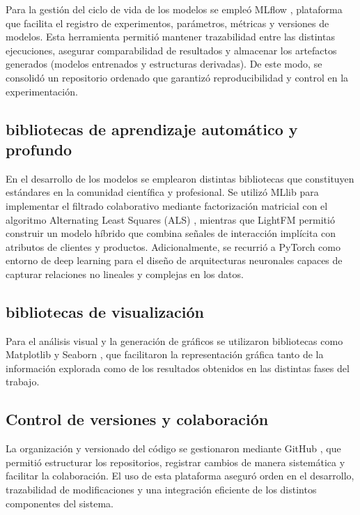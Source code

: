 Para la gestión del ciclo de vida de los modelos se empleó MLflow \cite{ARTICLE:MLflow2018}, plataforma que facilita el registro de experimentos, parámetros, métricas y versiones de modelos. Esta herramienta permitió mantener trazabilidad entre las distintas ejecuciones, asegurar comparabilidad de resultados y almacenar los artefactos generados (modelos entrenados y estructuras derivadas). De este modo, se consolidó un repositorio ordenado que garantizó reproducibilidad y control en la experimentación.

\subsection{bibliotecas de aprendizaje automático y profundo}

En el desarrollo de los modelos se emplearon distintas bibliotecas que constituyen estándares en la comunidad científica y profesional. Se utilizó MLlib para implementar el filtrado colaborativo mediante factorización matricial con el algoritmo Alternating Least Squares (ALS) \cite{ARTICLE:ALS2008}, mientras que LightFM \cite{ARTICLE:LightFM2015} permitió construir un modelo híbrido que combina señales de interacción implícita con atributos de clientes y productos. Adicionalmente, se recurrió a PyTorch como entorno de deep learning para el diseño de arquitecturas neuronales capaces de capturar relaciones no lineales y complejas en los datos. 

\subsection{bibliotecas de visualización}

Para el análisis visual y la generación de gráficos se utilizaron bibliotecas como Matplotlib \cite{ARTICLE:Matplotlib2007} y Seaborn \cite{ARTICLE:Seaborn2021}, que facilitaron la representación gráfica tanto de la información explorada como de los resultados obtenidos en las distintas fases del trabajo.

\subsection{Control de versiones y colaboración}

La organización y versionado del código se gestionaron mediante GitHub \cite{ARTICLE:GitHub}, que permitió estructurar los repositorios, registrar cambios de manera sistemática y facilitar la colaboración. El uso de esta plataforma aseguró orden en el desarrollo, trazabilidad de modificaciones y una integración eficiente de los distintos componentes del sistema.

